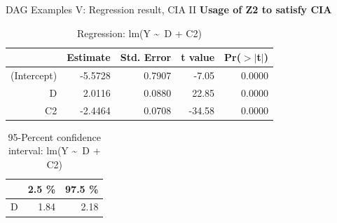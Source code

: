 \documentclass{beamer}\usepackage[]{graphicx}\usepackage[]{xcolor}
\begin{document}
\begin{frame}[fragile]{DAG Examples V: Regression result, CIA II}
\textbf{Usage of Z2 to satisfy CIA}
\begin{table}[ht]
\centering
\begingroup\small
\begin{tabular}{rrrrr}
  \hline
 & Estimate & Std. Error & t value & Pr($>$$|$t$|$) \\ 
  \hline
(Intercept) & -5.5728 & 0.7907 & -7.05 & 0.0000 \\ 
  D & 2.0116 & 0.0880 & 22.85 & 0.0000 \\ 
  C2 & -2.4464 & 0.0708 & -34.58 & 0.0000 \\ 
   \hline
\end{tabular}
\endgroup
\caption{Regression: lm(Y \textasciitilde ~D + C2)} 
\end{table}
\begin{table}[ht]
\centering
\begingroup\small
\begin{tabular}{rrr}
  \hline
 & 2.5 \% & 97.5 \% \\ 
  \hline
D & 1.84 & 2.18 \\ 
   \hline
\end{tabular}
\endgroup
\caption{95-Percent confidence interval: lm(Y \textasciitilde ~D + C2)} 
\end{table}

\end{frame}
\end{document}
